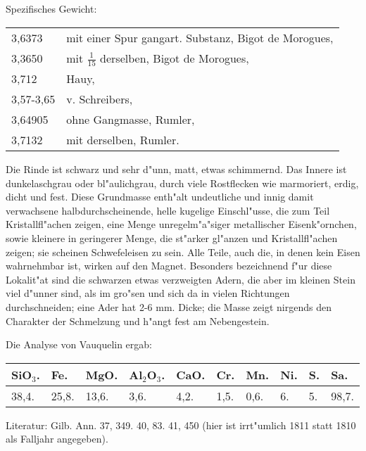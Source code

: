 \documentclass[a4paper, 11pt, oneside]{article}
\begin{document}
Spezifisches Gewicht:
\begin{table}[!ht]
    \centering\swabfamily\Large
    \begin{tabular}{l l}
        3,6373 & mit einer Spur gangart. Substanz, Bigot de Morogues,\\
        3,3650 & mit $\mathfrak{\frac{1}{15}}$ derselben, Bigot de Morogues,\\
        3,712 & Hauy,\\
        3,57-3,65 & v. Schreibers,\\
        3,64905 & ohne Gangmasse, Rumler,\\
        3,7132 & mit derselben, Rumler.
    \end{tabular}
\end{table}

Die Rinde ist schwarz und sehr d"unn, matt, etwas schimmernd. Das Innere ist dunkelaschgrau oder bl"aulichgrau, durch viele Rostflecken wie marmoriert, erdig, dicht und fest. Diese Grundmasse enth"alt undeutliche und innig damit verwachsene halbdurchscheinende, helle kugelige Einschl"usse, die zum Teil Kristallfl"achen zeigen, eine Menge unregelm"a"siger metallischer Eisenk"ornchen, sowie kleinere in geringerer Menge, die st"arker gl"anzen und Kristallfl"achen zeigen; sie scheinen Schwefeleisen zu sein. Alle Teile, auch die, in denen kein Eisen wahrnehmbar ist, wirken auf den Magnet. Besonders bezeichnend f"ur diese Lokalit"at sind die schwarzen etwas verzweigten Adern, die aber im kleinen Stein viel d"unner sind, als im gro"sen und sich da in vielen Richtungen durchschneiden; eine Ader hat 2-6 mm. Dicke; die Masse zeigt nirgends den Charakter der Schmelzung und h"angt fest am Nebengestein.

Die Analyse von Vauquelin ergab:
\begin{table}[!ht]
    \centering\swabfamily\Large
    \begin{tabular}{l l l l l l l l l l}
        SiO$_{3}$. & Fe. & MgO. & Al$_{2}$O$_{3}$. & CaO. & Cr. & Mn. & Ni. & S. & Sa. \\ \hline
        38,4. & 25,8. & 13,6. & 3,6. & 4,2. & 1,5. & 0,6. & 6. & 5. & 98,7. \\
    \end{tabular}
\end{table}

\normalsize
Literatur: Gilb. Ann. 37, 349. 40, 83. 41, 450 (hier ist irrt"umlich 1811 statt 1810 als Falljahr angegeben).
\subsection{}
\LARGE
\end{document}
